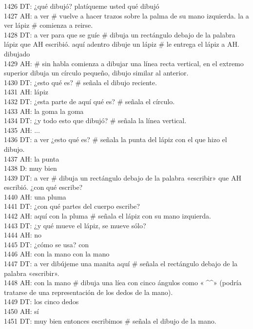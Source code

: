 1426 DT: ¿qué dibujó? platíqueme usted qué dibujó\\
1427 AH: a ver # vuelve a hacer trazos sobre la palma de su mano izquierda. la a ver lápiz # comienza a reirse. \\
1428 DT: a ver para que se guíe # dibuja un rectángulo debajo de la palabra lápiz que AH escribió. aquí adentro dibuje un lápiz # le entrega el lápiz a AH. dibujado\\
1429 AH: # sin habla comienza a dibujar una línea recta vertical, en el extremo superior dibuja un círculo pequeño, dibujo similar al anterior.\\
1430 DT: ¿esto qué es? # señala el dibujo reciente.\\
1431 AH: lápiz\\
1432 DT: ¿esta parte de aquí qué es? # señala el círculo.\\
1433 AH: la goma la goma\\
1434 DT: ¿y todo esto que dibujó? # señala la línea vertical.\\
1435 AH: ...\\
1436 DT: a ver ¿esto qué es? # señala la punta del lápiz con el que hizo el dibujo.\\
1437 AH: la punta\\
1438 D: muy bien\\
1439 DT: a ver # dibuja un rectángulo debajo de la palabra «escribir» que AH escribió. ¿con qué escribe?\\
1440 AH: una pluma\\
1441 DT: ¿con qué partes del cuerpo escribe?\\
1442 AH: aquí con la pluma # señala el lápiz con su mano izquierda.\\
1443 DT: ¿y qué mueve el lápiz, se mueve sólo?\\
1444 AH: no\\
1445 DT: ¿cómo se usa? con\\
1446 AH: con la mano con la mano\\
1447 DT: a ver dibújeme una manita aquí # señala el rectángulo debajo de la palabra «escribir».\\
1448 AH: con la mano # dibuja una líea con cinco ángulos como «^^^^^» (podría tratarse de una representación de los dedos de la mano).\\
1449 DT: los cinco dedos\\
1450 AH: sí\\
1451 DT: muy bien entonces escribimos # señala el dibujo de la mano.\\
